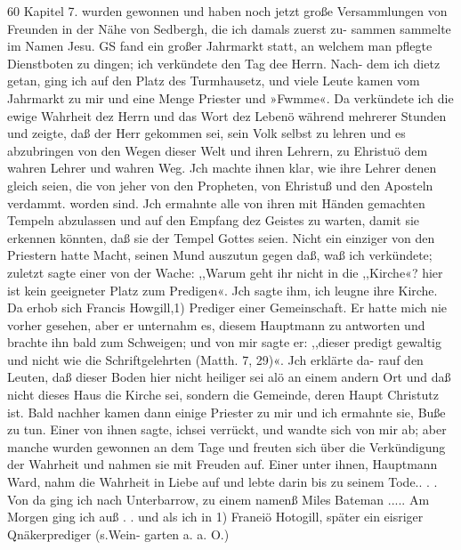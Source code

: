 
60 Kapitel 7.
wurden gewonnen und haben noch jetzt große Versammlungen von
Freunden in der Nähe von Sedbergh, die ich damals zuerst zu-
sammen sammelte im Namen Jesu.
GS fand ein großer Jahrmarkt statt, an welchem man pflegte
Dienstboten zu dingen; ich verkündete den Tag dee Herrn. Nach-
dem ich dietz getan, ging ich auf den Platz des Turmhausetz, und
viele Leute kamen vom Jahrmarkt zu mir und eine Menge Priester
und »Fwmme«. Da verkündete ich die ewige Wahrheit dez
Herrn und das Wort dez Lebenö während mehrerer Stunden
und zeigte, daß der Herr gekommen sei, sein Volk selbst zu lehren
und es abzubringen von den Wegen dieser Welt und ihren Lehrern,
zu Ehristuö dem wahren Lehrer und wahren Weg. Jch machte
ihnen klar, wie ihre Lehrer denen gleich seien, die von jeher
von den Propheten, von Ehristuß und den Aposteln verdammt.
worden sind. Jch ermahnte alle von ihren mit Händen gemachten
Tempeln abzulassen und auf den Empfang dez Geistes zu warten,
damit sie erkennen könnten, daß sie der Tempel Gottes seien.
Nicht ein einziger von den Priestern hatte Macht, seinen Mund
auszutun gegen daß, waß ich verkündete; zuletzt sagte einer von
der Wache: ,,Warum geht ihr nicht in die ,,Kirche«? hier ist
kein geeigneter Platz zum Predigen«. Jch sagte ihm, ich leugne
ihre Kirche. Da erhob sich Francis Howgill,1) Prediger einer
Gemeinschaft. Er hatte mich nie vorher gesehen, aber er unternahm
es, diesem Hauptmann zu antworten und brachte ihn bald zum
Schweigen; und von mir sagte er: ,,dieser predigt gewaltig und
nicht wie die Schriftgelehrten (Matth. 7, 29)«. Jch erklärte da-
rauf den Leuten, daß dieser Boden hier nicht heiliger sei alö an
einem andern Ort und daß nicht dieses Haus die Kirche sei,
sondern die Gemeinde, deren Haupt Christutz ist. Bald nachher
kamen dann einige Priester zu mir und ich ermahnte sie, Buße zu
tun. Einer von ihnen sagte, ichsei verrückt, und wandte sich von
mir ab; aber manche wurden gewonnen an dem Tage und freuten
sich über die Verkündigung der Wahrheit und nahmen sie mit
Freuden auf. Einer unter ihnen, Hauptmann Ward, nahm die
Wahrheit in Liebe auf und lebte darin bis zu seinem Tode.. . .
Von da ging ich nach Unterbarrow, zu einem namenß Miles
Bateman ..... Am Morgen ging ich auß . . und als ich in
1) Franeiö Hotogill, später ein eisriger Qnäkerprediger (s.Wein-
garten a. a. O.)


